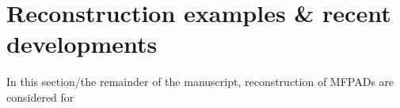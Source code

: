 \section{Reconstruction examples & recent developments}

In this section/the remainder of the manuscript, reconstruction of MFPADs are considered for 